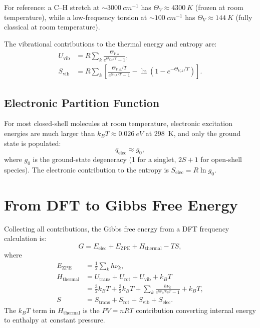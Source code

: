 \documentclass[11pt]{article}
\numberwithin{equation}{section}
\begin{document}
For reference: a C--H stretch at $\sim\!\SI{3000}{cm^{-1}}$ has $\Theta_V \approx \SI{4300}{K}$ (frozen at room temperature), while a low-frequency torsion at $\sim\!\SI{100}{cm^{-1}}$ has $\Theta_V \approx \SI{144}{K}$ (fully classical at room temperature).

The vibrational contributions to the thermal energy and entropy are:
\begin{align}
U_\text{vib} &= R\sum_k \frac{\Theta_{V,k}}{e^{\Theta_{V,k}/T}-1}, \label{eq:Uvib}\\
S_\text{vib} &= R\sum_k\left[\frac{\Theta_{V,k}/T}{e^{\Theta_{V,k}/T}-1} - \ln\!\left(1-e^{-\Theta_{V,k}/T}\right)\right]. \label{eq:Svib}
\end{align}

\subsection{Electronic Partition Function}

For most closed-shell molecules at room temperature, electronic excitation energies are much larger than $k_BT \approx \SI{0.026}{eV}$ at \SI{298}{K}, and only the ground state is populated:
\begin{equation}
q_\text{elec} \approx g_0,
\end{equation}
where $g_0$ is the ground-state degeneracy (1 for a singlet, $2S+1$ for open-shell species). The electronic contribution to the entropy is $S_\text{elec} = R\ln g_0$.


\section{From DFT to Gibbs Free Energy}
\label{sec:G_from_DFT}

Collecting all contributions, the Gibbs free energy from a DFT frequency calculation is:
\begin{equation}
\boxed{G = E_\text{elec} + E_\text{ZPE} + H_\text{thermal} - TS,}
\label{eq:G}
\end{equation}
where
\begin{align}
E_\text{ZPE} &= \frac{1}{2}\sum_k h\nu_k, \\
H_\text{thermal} &= U_\text{trans} + U_\text{rot} + U_\text{vib} + k_BT \nonumber\\
&= \frac{3}{2}k_BT + \frac{3}{2}k_BT + \sum_k\frac{h\nu_k}{e^{h\nu_k/k_BT}-1} + k_BT, \label{eq:Hthermal}\\
S &= S_\text{trans} + S_\text{rot} + S_\text{vib} + S_\text{elec}. \label{eq:Stotal}
\end{align}
The $k_BT$ term in $H_\text{thermal}$ is the $PV = nRT$ contribution converting internal energy to enthalpy at constant pressure.
\end{document}
